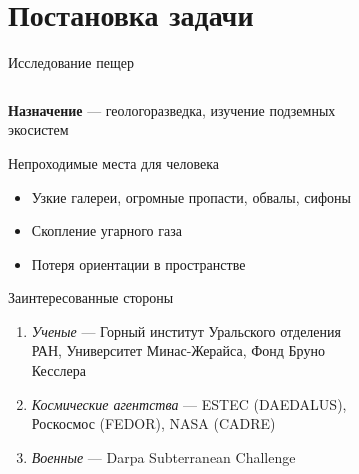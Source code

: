 \section{Постановка задачи}

\begin{frame}[t]{Исследование пещер}


    \begin{columns}[T,onlytextwidth]
        \begin{column}{0.62\textwidth}
            \small
                \textbf{Назначение} --- геологоразведка, изучение подземных экосистем
            \begin{exampleblock}{Непроходимые места для человека}
                \begin{itemize}
                    \item Узкие галереи, огромные пропасти, обвалы, сифоны
                    \item Скопление угарного газа
                    \item Потеря ориентации в пространстве
                \end{itemize}
            \end{exampleblock}
            \vspace{-0.2cm}
            \begin{alertblock}{Заинтересованные стороны}
                \begin{enumerate}
                    \item \textit{Ученые} --- Горный институт Уральского отделения РАН, Университет Минас-Жерайса, Фонд Бруно Кесслера
                    \item \textit{Космические агентства} --- ESTEC (DAEDALUS), Роскосмос (FEDOR), NASA (CADRE)
                    \item \textit{Военные} --- Darpa Subterranean Challenge
                \end{enumerate}
            \end{alertblock}
        \end{column}
        \begin{column}{0.37\textwidth}
            \begin{figure}[H]
                \begin{subfigure}{0.49\textwidth}
                    \centering\includegraphics[height=2cm,width=1\textwidth,keepaspectratio]{../images/slides/rip.jpg}

\end{subfigure}
\end{figure}
\end{column}
\end{columns}
\end{frame}
